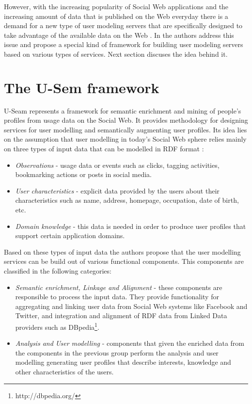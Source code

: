However, with the increasing popularity of Social Web applications and the increasing amount of data that is published on the Web everyday there is a demand for a new type of user modeling servers that are specifically designed to take advantage of the available data on the Web \cite{Kobsa07}. In \cite{Fabian} the authors address this issue and propose a special kind of framework for building user modeling servers based on various types of services. Next section discuses the idea behind it.

\section{The U-Sem framework}
U-Seam represents a framework for semantic enrichment and mining of people's profiles from usage data on the Social Web. It provides methodology for designing services for user modelling and semantically augmenting user profiles. Its idea lies on the assumption that user modelling in today's Social Web sphere relies mainly on three types of input data \cite{Fabian} that can be modelled in RDF format \cite{Miller98}:

\begin{itemize}
	\item \textit{Observations} - usage data or events such as clicks, tagging activities, bookmarking actions or posts in social media.
	
	\item \textit{User characteristics} - explicit data provided by the users about their characteristics such as name, address, homepage, occupation, date of birth, etc.
	
	\item \textit{Domain knowledge} - this data is needed in order to produce user profiles that support certain application domains.
\end{itemize}

Based on these types of input data the authors propose that the user modelling services can be build out of various functional components. This components are classified in the following categories:

\begin{itemize}
	\item \textit{Semantic enrichment, Linkage and Alignment} - these components are responsible to process the input data. They provide functionality for aggregating and linking user data from Social Web systems like Facebook and Twitter, and integration and alignment of RDF data from Linked Data providers such as DBpedia\footnote{http://dbpedia.org/}.
	
	\item \textit{Analysis and User modelling} - components that given the enriched data from the components in the previous group perform the analysis and user modelling generating user profiles that describe interests, knowledge and other characteristics of the users.
\end{itemize}

